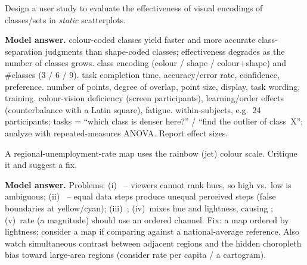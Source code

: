 \begin{qbox}
Design a user study to evaluate the effectiveness of visual encodings of
classes/sets in \emph{static} scatterplots.

\medskip\noindent\textbf{Model answer.}
 colour-coded classes yield faster and more accurate
class-separation judgments than shape-coded classes;  effectiveness
degrades as the number of classes grows.
 class encoding (colour / shape / colour+shape) and \#classes
(3 / 6 / 9).
 task completion time, accuracy/error rate, confidence, preference.
 number of points, degree of overlap, point size, display,
task wording, training.
 colour-vision deficiency (screen participants), learning/order
effects (counterbalance with a Latin square), fatigue.
 within-subjects, e.g.\ 24 participants; tasks = ``which class is
denser here?'' / ``find the outlier of class~X''; analyze with repeated-measures
ANOVA. Report effect sizes.
\end{qbox}

\begin{qbox}
A regional-unemployment-rate map uses the rainbow (jet) colour scale. Critique
it and suggest a fix.

\medskip\noindent\textbf{Model answer.}
Problems: (i)~ -- viewers cannot rank
hues, so high vs.\ low is ambiguous; (ii)~ --
equal data steps produce unequal perceived steps (false boundaries at
yellow/cyan); (iii)~; (iv)~mixes hue and lightness,
causing ; (v)~rate (a magnitude) should use an
ordered channel. Fix: a  map
ordered by lightness; consider a  map if comparing against a
national-average reference. Also watch simultaneous contrast between adjacent
regions and the hidden choropleth bias toward large-area regions
(consider rate per capita / a cartogram).
\end{qbox}

